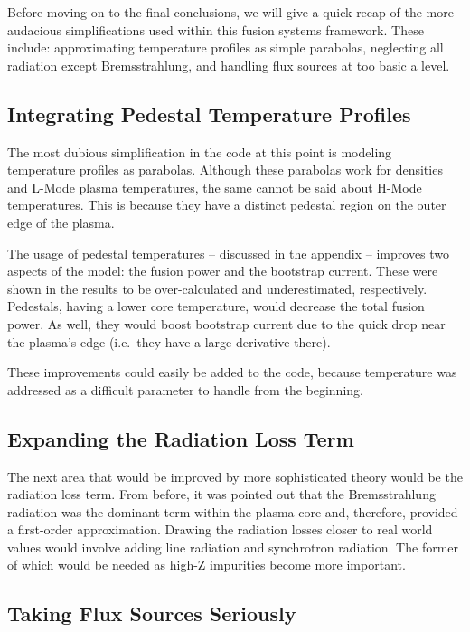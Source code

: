 Before moving on to the final conclusions, we will give a quick recap of the more audacious simplifications used within this fusion systems framework. These include: approximating temperature profiles as simple parabolas, neglecting all radiation except Bremsstrahlung, and handling flux sources at too basic a level.

\subsection{Integrating Pedestal Temperature Profiles}

The most dubious simplification in the code at this point is modeling temperature profiles as parabolas. Although these parabolas work for densities and L-Mode plasma temperatures, the same cannot be said about H-Mode temperatures. This is because they have a distinct pedestal region on the outer edge of the plasma.

The usage of pedestal temperatures -- discussed in the appendix -- improves two aspects of the model: the fusion power and the bootstrap current. These were shown in the results to be over-calculated and underestimated, respectively. Pedestals, having a lower core temperature, would decrease the total fusion power. As well, they would boost bootstrap current due to the quick drop near the plasma's edge (i.e.\ they have a large derivative there). 

These improvements could easily be added to the code, because temperature was addressed as a difficult parameter to handle from the beginning.

\subsection{Expanding the Radiation Loss Term}

The next area that would be improved by more sophisticated theory would be the radiation loss term. From before, it was pointed out that the Bremsstrahlung radiation was the dominant term within the plasma core and, therefore, provided a first-order approximation. Drawing the radiation losses closer to real world values would involve adding line radiation and synchrotron radiation. The former of which would be needed as high-Z impurities become more important.

\subsection{Taking Flux Sources Seriously}


